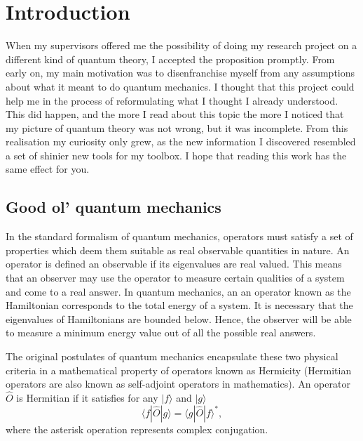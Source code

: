 \documentclass[10pt, a4paper, singlespacing]{report}
\begin{document}
\chapter{Introduction}\label{Introduction}
When my supervisors offered me the possibility of doing my research project on a different kind of quantum theory, I accepted the proposition promptly. 
From early on, my main motivation was to disenfranchise myself from any assumptions about what it meant to do quantum mechanics. I thought that this project could help me in the process of reformulating what I thought I already understood. This did happen, and the more I read about this topic the more I noticed that my picture of quantum theory was not wrong, but it was incomplete. From this realisation my curiosity only grew, as the new information I discovered resembled a set of shinier new tools for my toolbox. I hope that reading this work has the same effect for you.

\section{Good ol' quantum mechanics}\label{QM}
In the standard formalism of quantum mechanics, operators must satisfy a set of properties which deem them suitable as real observable quantities in nature.
An operator is defined an observable if its eigenvalues are real valued. This means that an observer may use the operator to measure certain qualities of a system and come to a real answer. In quantum mechanics, an an operator known as the Hamiltonian corresponds to the total energy of a system. It is necessary that the eigenvalues of Hamiltonians are bounded below. Hence, the observer will be able to measure a minimum energy value out of all the possible real answers.

The original postulates of quantum mechanics encapsulate these two physical criteria in a mathematical property of operators known as Hermicity (Hermitian operators are also known as self-adjoint operators in mathematics).
An operator $\hat{O}$ is Hermitian if it satisfies for any $|f \rangle$ and $|g\rangle$
\begin{equation} \label{eq:1}
\langle f|\widehat{O}|g\rangle = \langle g|\widehat{O}|f \rangle^{*},
\end{equation}
where the asterisk operation represents complex conjugation.
\end{document}
